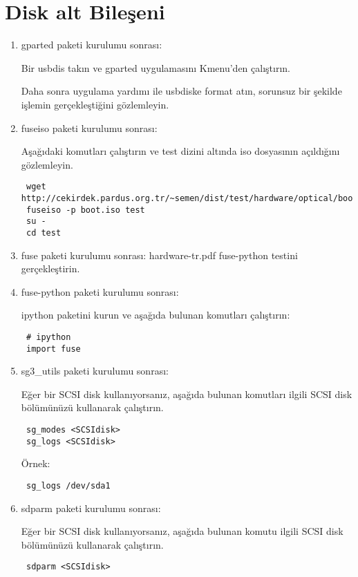 \documentclass[a4paper,10pt]{article}
\begin{document}
\section{Disk alt Bileşeni}
\begin{enumerate}
\item gparted paketi kurulumu sonrası:

Bir usbdis takın ve gparted uygulamasını Kmenu'den çalıştırın. 

Daha sonra uygulama yardımı ile usbdiske format atın, sorunsuz bir şekilde işlemin gerçekleştiğini gözlemleyin.
\item fuseiso paketi kurulumu sonrası:

Aşağıdaki komutları çalıştırın ve test dizini altında iso dosyasının açıldığını gözlemleyin.
\begin{verbatim}
 wget http://cekirdek.pardus.org.tr/~semen/dist/test/hardware/optical/boot.iso
 fuseiso -p boot.iso test
 su -
 cd test
\end{verbatim}

\item fuse paketi kurulumu sonrası:
hardware-tr.pdf fuse-python testini gerçekleştirin.

\item fuse-python paketi kurulumu sonrası:

ipython paketini kurun ve aşağıda bulunan komutları çalıştırın:
\begin{verbatim}
 # ipython
 import fuse
\end{verbatim}

\item sg3\_utils  paketi kurulumu sonrası:

Eğer bir SCSI disk kullanıyorsanız, aşağıda bulunan komutları ilgili SCSI disk bölümünüzü kullanarak çalıştırın.
\begin{verbatim}
 sg_modes <SCSIdisk>
 sg_logs <SCSIdisk>
\end{verbatim}

Örnek:
\begin{verbatim}
 sg_logs /dev/sda1
\end{verbatim}

\item sdparm paketi kurulumu sonrası:

Eğer bir SCSI disk kullanıyorsanız, aşağıda bulunan komutu ilgili SCSI disk bölümünüzü kullanarak çalıştırın.
\begin{verbatim}
 sdparm <SCSIdisk>
\end{verbatim}


\end{enumerate}
\end{document}
